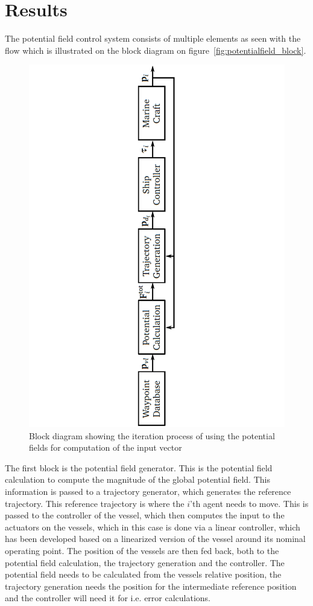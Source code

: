 \documentclass[a4paper,conference]{IEEEtran}
\begin{document}
\section{Results}
The potential field control system consists of multiple elements
as seen with the flow which is illustrated on the block diagram on
figure~\vref{fig:potentialfield_block}.
\begin{figure}[htbp]
\centering
\includegraphics[width=\linewidth]{fig/potentialfield_block}
\caption{Block diagram showing the iteration process of using the
potential fields for computation of the input vector}
\label{fig:potentialfield_block}
\end{figure}
The first block is the potential field generator. This is the
potential field calculation to compute the magnitude of the global
potential field. This information is passed to a trajectory generator,
which generates the reference trajectory. This reference trajectory is
where the $i$'th agent needs to move. This is passed to the controller
of the vessel, which then computes the input to the actuators on the
vessels, which in this case is done via a linear controller, which has been developed based on a linearized version of the vessel around its nominal operating point. The position of the vessels are then fed back, both to the
potential field calculation, the trajectory generation and the
controller. The potential field needs to be calculated from the
vessels relative position, the trajectory generation needs the
position for the intermediate reference position and the controller
will need it for i.e. error calculations.
\end{document}
